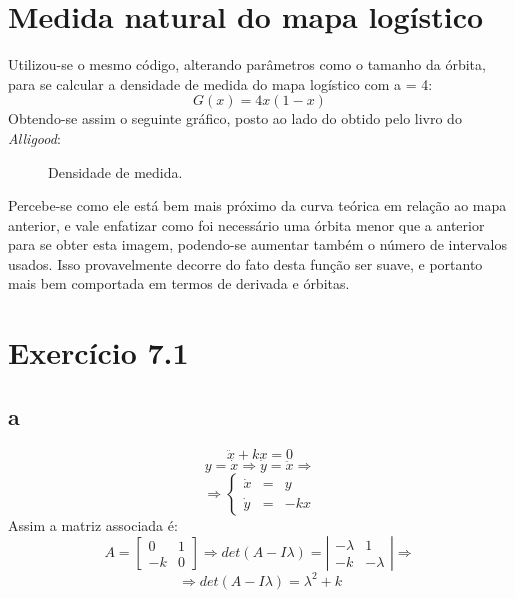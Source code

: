 \documentclass{article}[twocolumn]
\begin{document}
	\section{Medida natural do mapa log\'istico}
	Utilizou-se o mesmo c\'odigo, alterando par\^ametros como o tamanho da \'orbita,
	para se calcular a densidade de medida do mapa log\'istico com a = 4:
	\begin{equation}
		G(x) = 4x(1 - x)
		\nonumber
	\end{equation}
	Obtendo-se assim o seguinte gr\'afico, posto ao lado do obtido pelo livro do
	\textit{Alligood}:
	\begin{figure}[H]
		\centering
		\caption{Densidade de medida.}
	\end{figure}
	Percebe-se como ele est\'a bem mais pr\'oximo da curva te\'orica em rela\c{c}\~ao
	ao mapa anterior, e vale enfatizar como foi necess\'ario uma \'orbita menor que a anterior
	para se obter esta imagem, podendo-se aumentar tamb\'em o n\'umero de intervalos usados.
	Isso provavelmente decorre do fato desta fun\c{c}\~ao ser suave, e portanto mais bem
	comportada em termos de derivada e \'orbitas.
	\section{Exerc\'icio 7.1}
	\subsection{a}
	\begin{equation}
		\ddot{x} + kx = 0
		\nonumber
	\end{equation}
	\begin{equation}
		y = \dot{x} \Rightarrow \dot{y} = \ddot{x} \Rightarrow
		\nonumber
	\end{equation}
	\begin{equation}
		\Rightarrow \left\{\begin{array}{lll}
			\dot{x} & = & y\\
			\dot{y} & = & -kx
		\end{array}\right.
		\nonumber
	\end{equation}
	Assim a matriz associada \'e:
	\begin{equation}
		A = \left[\begin{array}{cc}
			0 & 1\\
			-k & 0
		\end{array}\right] \Rightarrow
		det(A - I\lambda) = \left|\begin{array}{cc}
			-\lambda & 1\\
			-k & -\lambda
		\end{array}\right| \Rightarrow
		\nonumber
	\end{equation}
	\begin{equation}
		\Rightarrow det(A - I\lambda) = \lambda^2 + k
		\nonumber
	\end{equation}
\end{document}
